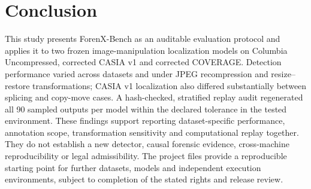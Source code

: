 \section{Conclusion}
This study presents ForenX-Bench as an auditable evaluation protocol and applies it to two frozen image-manipulation localization models on Columbia Uncompressed, corrected CASIA v1 and corrected COVERAGE. Detection performance varied across datasets and under JPEG recompression and resize--restore transformations; CASIA v1 localization also differed substantially between splicing and copy-move cases. A hash-checked, stratified replay audit regenerated all 90 sampled outputs per model within the declared tolerance in the tested environment. These findings support reporting dataset-specific performance, annotation scope, transformation sensitivity and computational replay together. They do not establish a new detector, causal forensic evidence, cross-machine reproducibility or legal admissibility. The project files provide a reproducible starting point for further datasets, models and independent execution environments, subject to completion of the stated rights and release review.
